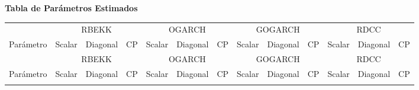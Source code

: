 \documentclass{article}
\begin{document}
\begin{center}
    \textbf{Tabla de Parámetros Estimados}
\end{center}

\begin{longtable}{l*{12}{c}}
\toprule
& \multicolumn{3}{c}{RBEKK} & \multicolumn{3}{c}{OGARCH} & \multicolumn{3}{c}{GOGARCH} & \multicolumn{3}{c}{RDCC} \\
\cmidrule(lr){2-4} \cmidrule(lr){5-7} \cmidrule(lr){8-10} \cmidrule(lr){11-13}
Parámetro & Scalar & Diagonal & CP & Scalar & Diagonal & CP & Scalar & Diagonal & CP & Scalar & Diagonal & CP \\
\midrule
\endfirsthead

\toprule
& \multicolumn{3}{c}{RBEKK} & \multicolumn{3}{c}{OGARCH} & \multicolumn{3}{c}{GOGARCH} & \multicolumn{3}{c}{RDCC} \\
\cmidrule(lr){2-4} \cmidrule(lr){5-7} \cmidrule(lr){8-10} \cmidrule(lr){11-13}
Parámetro & Scalar & Diagonal & CP & Scalar & Diagonal & CP & Scalar & Diagonal & CP & Scalar & Diagonal & CP \\
\midrule
\endhead

\bottomrule
\endfoot


\end{longtable}
\end{document}
